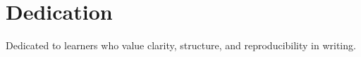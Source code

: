 \chapter*{Dedication}
Dedicated to learners who value clarity, structure, and reproducibility in writing.
